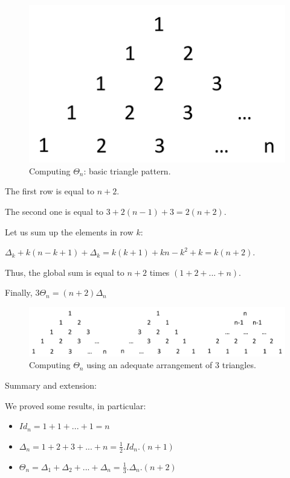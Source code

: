 \begin{figure}[h]
\begin{center}
        \includegraphics[scale=0.5]{FiguresArithmetic/TetrahedralBasic}
        \caption{Computing $\Theta_n$: basic triangle pattern.}
        \label{fig:Tetrahedral}
\end{center}
\end{figure}

The first row is equal to $n+2$.

The second one is equal to $3 + 2(n-1)+3 = 2(n+2)$. 

Let us sum up the elements in row $k$: 

$\Delta_k + k(n-k+1) + \Delta_k = k(k+1) +kn-k^2+k = k(n+2)$.

Thus, the global sum is equal to $n+2$ times $(1+2+...+n)$.

Finally, $3 \Theta_n = (n+2) \Delta_n$

\begin{figure}[h]
\begin{center}
        \includegraphics[scale=0.5]{FiguresArithmetic/Tetrahedral}
        \caption{Computing $\Theta_n$ using an adequate arrangement of $3$ triangles.}
        \label{fig:Tetrahedral}
\end{center}
\end{figure}

Summary and extension:

We proved some results, in particular:
\begin{itemize}
\item $Id_n = 1+1+ ... +1 = n$
\item $\Delta_n = 1+2+3+ ... +n = \frac{1}{2}.Id_n.(n+1)$
\item $\Theta_n = \Delta_1 + \Delta_2 + ... + \Delta_n = \frac{1}{3} .\Delta_n.(n+2)$
\end{itemize}

